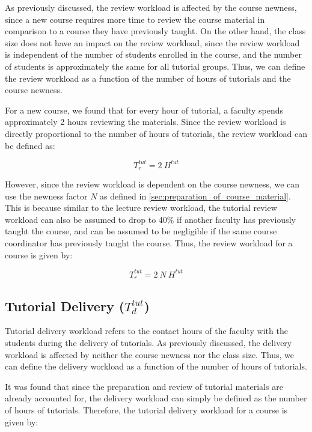 As previously discussed, the review workload is affected by the course newness, since a new course requires more time to review the course material in comparison to a course they have previously taught. On the other hand, the class size does not have an impact on the review workload, since the review workload is independent of the number of students enrolled in the course, and the number of students is approximately the same for all tutorial groups. Thus, we can define the review workload as a function of the number of hours of tutorials and the course newness.

For a new course, we found that for every hour of tutorial, a faculty spends approximately 2 hours reviewing the materials. Since the review workload is directly proportional to the number of hours of tutorials, the review workload can be defined as:

\begin{equation*}
  T_r^{tut} = 2\ H^{tut}
\end{equation*}

However, since the review workload is dependent on the course newness, we can use the newness factor \(N\) as defined in \autoref{sec:preparation_of_course_material}. This is because similar to the lecture review workload, the tutorial review workload can also be assumed to drop to 40\% if another faculty has previously taught the course, and can be assumed to be negligible if the same course coordinator has previously taught the course. Thus, the review workload for a course is given by:

\begin{equation}
  \label{eqn:tutorial-review-workload}
  T_r^{tut} = 2\ N \ H^{tut}
\end{equation}

\subsection{Tutorial Delivery (\texorpdfstring{\(T_d^{tut}\)}{})}

Tutorial delivery workload refers to the contact hours of the faculty with the students during the delivery of tutorials. As previously discussed, the delivery workload is affected by neither the course newness nor the class size. Thus, we can define the delivery workload as a function of the number of hours of tutorials.

It was found that since the preparation and review of tutorial materials are already accounted for, the delivery workload can simply be defined as the number of hours of tutorials. Therefore, the tutorial delivery workload for a course is given by:

